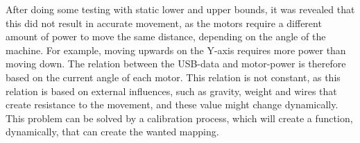 After doing some testing with static lower and upper bounds, it was revealed that this did not result in accurate movement, as the motors require a different amount of power to move the same distance, depending on the angle of the machine.
For example, moving upwards on the Y-axis requires more power than moving down.
The relation between the USB-data and motor-power is therefore based on the current angle of each motor.
This relation is not constant, as this relation is based on external influences, such as gravity, weight and wires that create resistance to the movement, and these value might change dynamically.
This problem can be solved by a calibration process, which will create a function, dynamically, that can create the wanted mapping.
